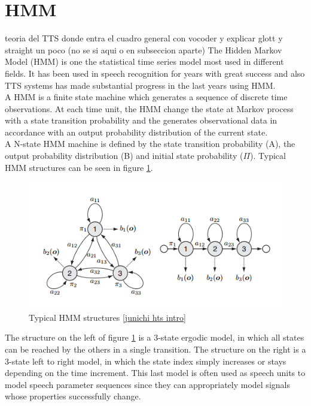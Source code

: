 \section{HMM}\label{hmm}
teoria del TTS donde entra el cuadro general con vocoder y explicar glott y straight un poco (no se si aqui o en subseccion aparte)
The Hidden Markov Model (HMM) is one the statistical time series model most used in different fields. It has been used in speech recognition for years with great success and also TTS systems has made substantial progress in the last years using HMM.\\
A HMM is a finite state machine which generates a sequence of discrete time observations. At each time unit, the HMM change the state at Markov process with a state transition probability and the generates observational data in accordance with an output probability distribution of the current state.\\
A N-state HMM machine is defined by the state transition probability (A), the output probability distribution (B) and initial state probability ($\Pi$). Typical HMM structures can be seen in figure \ref{hmmstruct}.\\
\begin{figure}[!htb]
	\begin{center}
	\includegraphics[width=1\textwidth]{img/hmmstruct.png}
	\end{center}
	\caption{\label{hmmstruct}Typical HMM structures \ref{junichi hts intro}}
\end{figure}
The structure on the left of figure \ref{hmmstruct} is a 3-state ergodic model, in which all states can be reached by the others in a single transition. The structure on the right is a 3-state left to right model, in which the state index simply increases or stays depending on the time increment. This last model is often used as speech units to model speech parameter sequences since they can appropriately model signals whose properties successfully change.\\
\clearpage%
